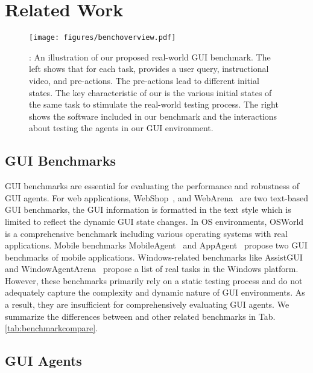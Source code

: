 \section{Related Work}
\begin{figure*}[t]

\begin{center}
\centerline{\texttt{[image: figures/benchoverview.pdf]}}
\vskip -0.1in
\caption{\textbf{\bench{}}: An illustration of our proposed real-world GUI benchmark. The left shows that for each task, \bench{} provides a user query, instructional video, and pre-actions. The pre-actions lead to different initial states. The key characteristic of our \bench{} is the various initial states of the same task to stimulate the real-world testing process. The right shows the software included in our benchmark and the interactions about testing the agents in our GUI environment.}
\label{fig:benchoverview}
\end{center}
\vskip -0.3in
\end{figure*}

\subsection{GUI Benchmarks}

GUI benchmarks are essential for evaluating the performance and robustness of GUI agents. For web applications, WebShop~\cite{webshop}, and WebArena~\cite{webarena} are two text-based GUI benchmarks, the GUI information is formatted in the text style which is limited to reflect the dynamic GUI state changes. In OS environments, OSWorld~\cite{OSWorld} is a comprehensive benchmark including various operating systems with real applications. Mobile benchmarks MobileAgent~\cite{wang2024mobile} and AppAgent~\cite{zhang2023appagent} propose two GUI benchmarks of mobile applications. Windows-related benchmarks like AssistGUI~\cite{assistgui} and WindowAgentArena~\cite{windowsagentarena} propose a list of real tasks in the Windows platform. 
However, these benchmarks primarily rely on a static testing process and do not adequately capture the complexity and dynamic nature of GUI environments. As a result, they are insufficient for comprehensively evaluating GUI agents. We summarize the differences between \bench{} and other related benchmarks in Tab. \ref{tab:benchmarkcompare}.

\subsection{GUI Agents}

